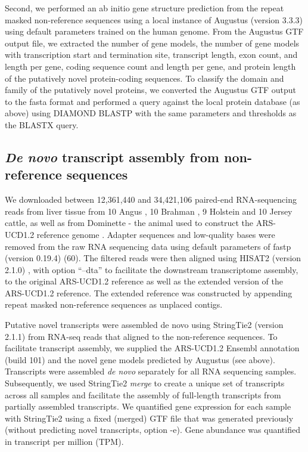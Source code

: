 \documentclass[../main.tex]{subfiles}
\begin{document}
Second, we performed an ab initio gene structure prediction from the repeat masked non-reference sequences using a local instance of Augustus (version 3.3.3) \citep{stanke2003gene} using default parameters trained on the human genome. From the Augustus GTF output file, we extracted the number of gene models, the number of gene models with transcription start and termination site, transcript length, exon count, and length per gene, coding sequence count and length per gene, and protein length of the putatively novel protein-coding sequences. To classify the domain and family of the putatively novel proteins, we converted the Augustus GTF output to the fasta format and performed a query against the local protein database (as above) using DIAMOND BLASTP with the same parameters and thresholds as the BLASTX query.

\subsection*{\emph{De novo} transcript assembly from non-reference sequences}

We downloaded between 12,361,440 and 34,421,106 paired-end RNA-sequencing reads from liver tissue from 10 Angus \citep{xiang2018genome}, 10 Brahman \citep{nguyen2016p1012}, 9 Holstein and 10 Jersey \citep{salleh2018gene} cattle, as well as from Dominette - the animal used to construct the ARS-UCD1.2 reference genome \citep{rosen2020novo}. Adapter sequences and low-quality bases were removed from the raw RNA sequencing data using default parameters of fastp (version 0.19.4) (60). The filtered reads were then aligned using HISAT2 (version 2.1.0) \citep{kim2019graph}, with option “--dta” to facilitate the downstream transcriptome assembly, to the original ARS-UCD1.2 reference as well as the extended version of the ARS-UCD1.2 reference. The extended reference was constructed by appending repeat masked non-reference sequences as unplaced contigs.  

Putative novel transcripts were assembled de novo using StringTie2 (version 2.1.1) \citep{kovaka2019transcriptome} from RNA-seq reads that aligned to the non-reference sequences. To facilitate transcript assembly, we supplied the ARS-UCD1.2 Ensembl annotation (build 101) and the novel gene models predicted by Augustus (see above). Transcripts were assembled \emph{de novo} separately for all RNA sequencing samples. Subsequently, we used StringTie2 \emph{merge} to create a unique set of transcripts across all samples and facilitate the assembly of full-length transcripts from partially assembled transcripts. We quantified gene expression for each sample with StringTie2 using a fixed (merged) GTF file that was generated previously (without predicting novel transcripts, option -e). Gene abundance was quantified in transcript per million (TPM).  
\end{document}
